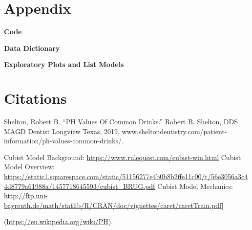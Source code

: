\documentclass[]{report}
\begin{document}
\hypertarget{Appendix}{%
\chapter*{Appendix}\label{Appendix}}

\textbf{Code}

\textbf{Data Dictionary}

\textbf{Exploratory Plots and List Models}

\hypertarget{citations}{%
\chapter{Citations}\label{citations}}

Shelton, Robert B. ``PH Values Of Common Drinks.'' Robert B. Shelton,
DDS MAGD Dentist Longview Texas, 2019,
www.sheltondentistry.com/patient-information/ph-values-common-drinks/.

Cubist Model Background: \url{https://www.rulequest.com/cubist-win.html}
Cubist Model Overview:
\url{https://static1.squarespace.com/static/51156277e4b0b8b2ffe11c00/t/56e3056a3c44d8779a61988a/1457718645593/cubist_BRUG.pdf}
Cubist Model Mechanics:
\url{http://ftp.uni-bayreuth.de/math/statlib/R/CRAN/doc/vignettes/caret/caretTrain.pdf}{]}

(\url{https://en.wikipedia.org/wiki/PH}).
\end{document}
